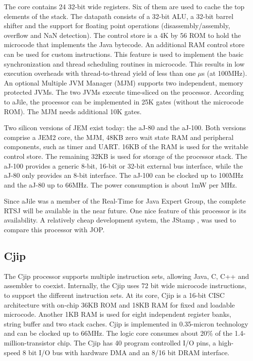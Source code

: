 The core contains 24 32-bit wide registers. Six of them are used to
cache the top elements of the stack. The datapath consists of a
32-bit ALU, a 32-bit barrel shifter and the support for floating
point operations (disassembly/assembly, overflow and NaN detection).
The control store is a 4K by 56 ROM to hold the microcode that
implements the Java bytecode. An additional RAM control store can be
used for custom instructions. This feature is used to implement the
basic synchronization and thread scheduling routines in microcode.
This results in low execution overheads with thread-to-thread yield
of less than one $\mu$s (at 100MHz). An optional Multiple JVM
Manager (MJM) supports two independent, memory protected JVMs. The
two JVMs execute time-sliced on the processor. According to aJile,
the processor can be implemented in 25K gates (without the microcode
ROM). The MJM needs additional 10K gates.

Two silicon versions of JEM exist today: the aJ-80 and the aJ-100.
Both versions comprise a JEM2 core, the MJM, 48KB zero wait state
RAM and peripheral components, such as timer and UART. 16KB of the
RAM is used for the writable control store. The remaining 32KB is
used for storage of the processor stack. The aJ-100 provides a
generic 8-bit, 16-bit or 32-bit external bus interface, while the
aJ-80 only provides an 8-bit interface. The aJ-100 can be clocked up
to 100MHz and the aJ-80 up to 66MHz. The power consumption is about
1mW per MHz.

Since aJile was a member of the Real-Time for Java Expert Group, the
complete RTSJ will be available in the near future. One nice feature
of this processor is its availability. A relatively cheap
development system, the JStamp \cite{JStamp}, was used to compare
this processor with JOP.

\subsection{Cjip}

The Cjip processor \cite{Imsys, Cjip} supports multiple instruction
sets, allowing Java, C, C++ and assembler to coexist. Internally,
the Cjip uses 72 bit wide microcode instructions, to support the
different instruction sets. At its core, Cjip is a 16-bit CISC
architecture with on-chip 36KB ROM and 18KB RAM for fixed and
loadable microcode. Another 1KB RAM is used for eight independent
register banks, string buffer and two stack caches. Cjip is
implemented in 0.35-micron technology and can be clocked up to
66MHz. The logic core consumes about 20\% of the
1.4-million-transistor chip. The Cjip has 40 program controlled I/O
pins, a high-speed 8 bit I/O bus with hardware DMA and an 8/16 bit
DRAM interface.


